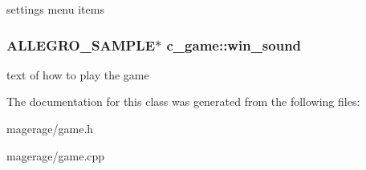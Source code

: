 settings menu items \hypertarget{classc__game_a3c80191dc85a3820526afb0f97355204}{
\subsubsection[{win\-\_\-sound}]{\setlength{\rightskip}{0pt plus 5cm}A\-L\-L\-E\-G\-R\-O\-\_\-\-S\-A\-M\-P\-L\-E$\ast$ c\-\_\-game\-::win\-\_\-sound\hspace{0.3cm}{\ttfamily [protected]}}}\label{classc__game_a3c80191dc85a3820526afb0f97355204}
text of how to play the game 

The documentation for this class was generated from the following files\-:\begin{DoxyCompactItemize}
\item 
magerage/game.\-h\item 
magerage/game.\-cpp\end{DoxyCompactItemize}
